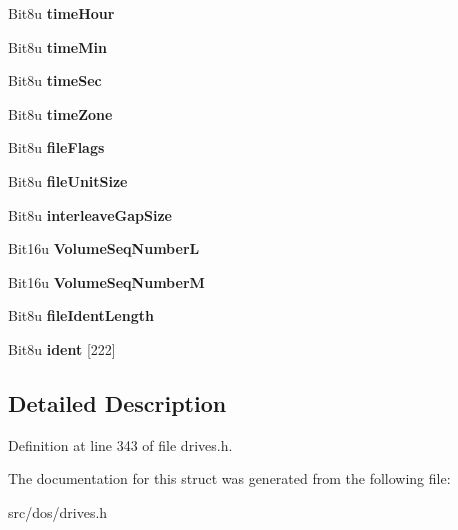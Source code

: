 \begin{DoxyCompactItemize}
\item 
\hypertarget{structisoDirEntry_ad5f7d5ba46e893d19ef699d39a44b875}{Bit8u {\bfseries time\-Hour}}\label{structisoDirEntry_ad5f7d5ba46e893d19ef699d39a44b875}

\item 
\hypertarget{structisoDirEntry_a8babe3c17f3931ffbe6cbba20cfb18b8}{Bit8u {\bfseries time\-Min}}\label{structisoDirEntry_a8babe3c17f3931ffbe6cbba20cfb18b8}

\item 
\hypertarget{structisoDirEntry_aeeda5230d96dd1fc08463136d84f673b}{Bit8u {\bfseries time\-Sec}}\label{structisoDirEntry_aeeda5230d96dd1fc08463136d84f673b}

\item 
\hypertarget{structisoDirEntry_a989029e709520fd23b8dbe878b66e729}{Bit8u {\bfseries time\-Zone}}\label{structisoDirEntry_a989029e709520fd23b8dbe878b66e729}

\item 
\hypertarget{structisoDirEntry_a6c73c88e3eb3329d826091048233e783}{Bit8u {\bfseries file\-Flags}}\label{structisoDirEntry_a6c73c88e3eb3329d826091048233e783}

\item 
\hypertarget{structisoDirEntry_a079492a83780a0316e44bc79b53102e1}{Bit8u {\bfseries file\-Unit\-Size}}\label{structisoDirEntry_a079492a83780a0316e44bc79b53102e1}

\item 
\hypertarget{structisoDirEntry_a6075892ffd1990542c8e68deb4621ddb}{Bit8u {\bfseries interleave\-Gap\-Size}}\label{structisoDirEntry_a6075892ffd1990542c8e68deb4621ddb}

\item 
\hypertarget{structisoDirEntry_ac4632844fa457e6a3efe05744db8e08e}{Bit16u {\bfseries Volume\-Seq\-Number\-L}}\label{structisoDirEntry_ac4632844fa457e6a3efe05744db8e08e}

\item 
\hypertarget{structisoDirEntry_a993c6f1d2836d163140d7c447da856ee}{Bit16u {\bfseries Volume\-Seq\-Number\-M}}\label{structisoDirEntry_a993c6f1d2836d163140d7c447da856ee}

\item 
\hypertarget{structisoDirEntry_a80c4c5121bb984a0d310d897f1cfaecb}{Bit8u {\bfseries file\-Ident\-Length}}\label{structisoDirEntry_a80c4c5121bb984a0d310d897f1cfaecb}

\item 
\hypertarget{structisoDirEntry_adcd0165ef3a6a392c001c2c3d0326b98}{Bit8u {\bfseries ident} \mbox{[}222\mbox{]}}\label{structisoDirEntry_adcd0165ef3a6a392c001c2c3d0326b98}

\end{DoxyCompactItemize}


\subsection{Detailed Description}


Definition at line 343 of file drives.\-h.



The documentation for this struct was generated from the following file\-:\begin{DoxyCompactItemize}
\item 
src/dos/drives.\-h\end{DoxyCompactItemize}
